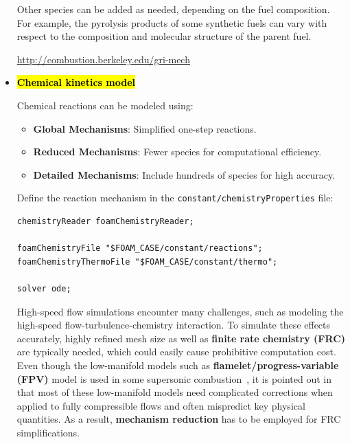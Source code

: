 \documentclass[12pt]{article}
\begin{document}
\begin{itemize}
Other species can be added as needed, depending on the fuel composition. For example, the pyrolysis products of some synthetic fuels can vary with respect to the composition and molecular structure of the parent fuel.


\url{http://combustion.berkeley.edu/gri-mech}
%
    \item \hl{\textbf{Chemical kinetics model}}
    
    Chemical reactions can be modeled using:
    \begin{itemize}
    \item \textbf{Global Mechanisms}: Simplified one-step reactions.
    \item \textbf{Reduced Mechanisms}: Fewer species for computational efficiency.
    \item \textbf{Detailed Mechanisms}: Include hundreds of species for high accuracy.
    \end{itemize}
    Define the reaction mechanism in the \texttt{constant/chemistryProperties} file:
%
\begin{lstlisting}[language={}, caption={Chemistry Properties in OpenFOAM.}]
chemistryReader foamChemistryReader;

foamChemistryFile "$FOAM_CASE/constant/reactions";
foamChemistryThermoFile "$FOAM_CASE/constant/thermo";

solver ode;
\end{lstlisting}

High-speed flow simulations encounter many challenges, such as modeling the high-speed flow-turbulence-chemistry interaction. To simulate these effects accurately, highly refined mesh size as well as \textbf{finite rate chemistry (FRC)} are typically needed, which could easily cause prohibitive computation cost. Even though the low-manifold models such as \textbf{flamelet/progress-variable (FPV)} model is used in some supersonic combustion~\cite{cymbalist2016application}, it is pointed out in~\cite{mrema2019large} that most of these low-manifold models need complicated corrections when applied to fully compressible flows and often mispredict key physical quantities. As a result, \textbf{mechanism reduction} has to be employed for FRC simplifications.


\end{itemize}
\end{document}
